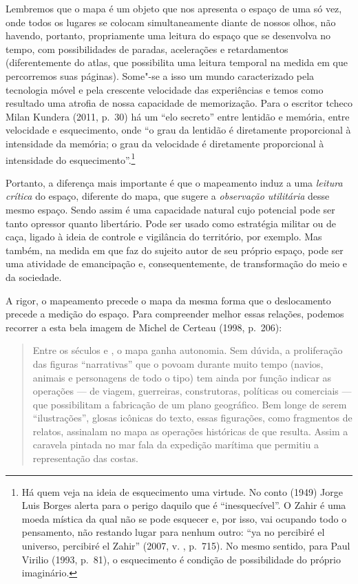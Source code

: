 Lembremos que o mapa é um objeto que nos apresenta o espaço de uma só
vez, onde todos os lugares se colocam simultaneamente diante de nossos
olhos, não havendo, portanto, propriamente uma leitura do espaço que se
desenvolva no tempo, com possibilidades de paradas, acelerações e
retardamentos (diferentemente do atlas, que possibilita uma leitura
temporal na medida em que percorremos suas páginas). Some"-se a isso um
mundo caracterizado pela tecnologia móvel e pela crescente velocidade
das experiências e temos como resultado uma atrofia de nossa capacidade
de memorização. Para o escritor tcheco Milan Kundera (2011, p.~30) há um
``elo secreto'' entre lentidão e memória, entre velocidade e
esquecimento, onde ``o grau da lentidão é diretamente proporcional à
intensidade da memória; o grau da velocidade é diretamente
proporcional à intensidade do esquecimento''.\footnote{Há quem veja na
  ideia de esquecimento uma virtude. No conto {} (1949)
  Jorge Luis Borges alerta para o perigo daquilo que é ``inesquecível''.
  O Zahir é uma moeda mística da qual não se pode esquecer e, por isso,
  vai ocupando todo o pensamento, não restando lugar para nenhum outro:
  ``ya no percibiré el universo, percibiré el Zahir'' (2007, v. , p.~715). No mesmo sentido, para Paul Virilio (1993, p.~81), o esquecimento é
  condição de possibilidade do próprio imaginário.}

Portanto, a diferença mais importante é que o mapeamento induz a uma
\emph{leitura crítica} do espaço, diferente do mapa, que sugere a
\emph{observação utilitária} desse mesmo espaço. Sendo assim é uma capacidade natural cujo potencial pode ser tanto opressor quanto libertário. Pode ser usado como estratégia militar ou de caça, ligado à ideia de controle e vigilância do território, por exemplo. Mas também, na medida em que faz do sujeito autor de seu próprio espaço, pode ser uma atividade de emancipação e, consequentemente, de transformação do meio e da sociedade.

A rigor, o mapeamento precede o mapa da mesma forma que o deslocamento
precede a medição do espaço. Para compreender melhor essas relações,
podemos recorrer a esta bela imagem de Michel de Certeau (1998, p.~206):

\begin{quote}
Entre os séculos  e , o mapa ganha autonomia. Sem dúvida, a
proliferação das figuras ``narrativas'' que o povoam durante muito tempo
(navios, animais e personagens de todo o tipo) tem ainda por função
indicar as operações --- de viagem, guerreiras, construtoras, políticas
ou comerciais --- que possibilitam a fabricação de um plano geográfico.
Bem longe de serem ``ilustrações'', glosas icônicas do texto, essas
figurações, como fragmentos de relatos, assinalam no mapa as operações
históricas de que resulta. Assim a caravela pintada no mar fala da
expedição marítima que permitiu a representação das costas.
\end{quote}

